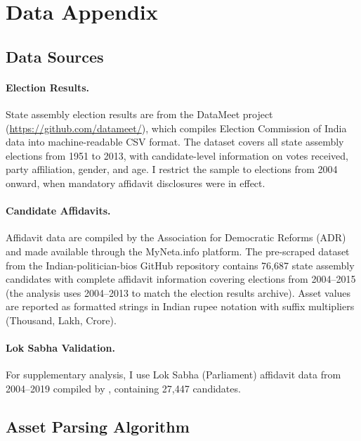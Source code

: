 \documentclass[12pt]{article}
\begin{document}
\label{apep_main_text_end}
\newpage


\newpage
\appendix

\section{Data Appendix}

\subsection{Data Sources}

\paragraph{Election Results.} State assembly election results are from the DataMeet project (\url{https://github.com/datameet/}), which compiles Election Commission of India data into machine-readable CSV format. The dataset covers all state assembly elections from 1951 to 2013, with candidate-level information on votes received, party affiliation, gender, and age. I restrict the sample to elections from 2004 onward, when mandatory affidavit disclosures were in effect.

\paragraph{Candidate Affidavits.} Affidavit data are compiled by the Association for Democratic Reforms (ADR) and made available through the MyNeta.info platform. The pre-scraped dataset from the Indian-politician-bios GitHub repository \citep{inrolls2020} contains 76,687 state assembly candidates with complete affidavit information covering elections from 2004--2015 (the analysis uses 2004--2013 to match the election results archive). Asset values are reported as formatted strings in Indian rupee notation with suffix multipliers (Thousand, Lakh, Crore).

\paragraph{Lok Sabha Validation.} For supplementary analysis, I use Lok Sabha (Parliament) affidavit data from 2004--2019 compiled by \citet{bkamapantula2020}, containing 27,447 candidates.

\subsection{Asset Parsing Algorithm}
\end{document}
